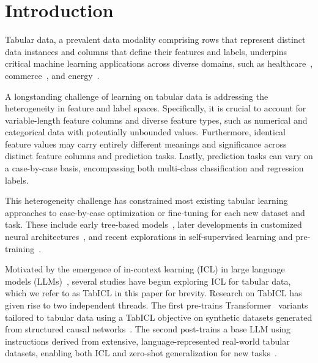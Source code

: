 \section{Introduction}
\label{sec:intro}

Tabular data, a prevalent data modality comprising rows that represent distinct data instances and columns that define their features and labels, underpins critical machine learning applications across diverse domains, such as healthcare~\citep{johnson2016mimic}, commerce~\citep{bohanec2017PredSales}, and energy~\citep{miller2020EnergyPred}.

A longstanding challenge of learning on tabular data is addressing the heterogeneity in feature and label spaces. Specifically, it is crucial to account for variable-length feature columns and diverse feature types, such as numerical and categorical data with potentially unbounded values. Furthermore, identical feature values may carry entirely different meanings and significance across distinct feature columns and prediction tasks. Lastly, prediction tasks can vary on a case-by-case basis, encompassing both multi-class classification and regression labels.

This heterogeneity challenge has constrained most existing tabular learning approaches to case-by-case optimization or fine-tuning for each new dataset and task. These include early tree-based models~\citep{chen2016XGBoost,ke2017LightGBM,prokhorenkova2018catboost}, later developments in customized neural architectures~\citep{huang2020TabTransformer,arik2021TabNet, katzir2021Net-DNF,gorishniy2021revisit_tab_dnn,gorishniy2024TabR}, and recent explorations in self-supervised learning and pre-training~\citep{yoon2020VIME,somepalli2021SAINT,ucar2021SubTab,bahri2022SCARF,wang2022TransTab,levin2023transfer_tab_nn,zhu2023XTab,yang2023UniTabE,yan2024TP-BERTa,ye2024CM2,ye2024PTaRL}.

Motivated by the emergence of in-context learning (ICL) in large language models (LLMs)~\citep{Brown2020GPT-3}, several studies have begun exploring ICL for tabular data, which we refer to as TabICL in this paper for brevity. Research on TabICL has given rise to two independent threads.
The first pre-trains Transformer~\citep{vaswani2017attention} variants tailored to tabular data using a TabICL objective on synthetic datasets generated from structured causal networks~\citep{hollmann2023TabPFN,hollmann2025TabPFNv2}.
The second post-trains a base LLM using instructions derived from extensive, language-represented real-world tabular datasets, enabling both ICL and zero-shot generalization for new tasks~\citep{wen2024GTL,gardner2024TabuLa}.

